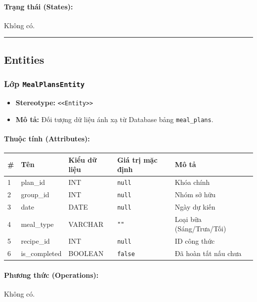 \documentclass[12pt,a4paper]{article}
\begin{document}
\paragraph{Trạng thái (States):}
Không có.

\vskip 0.5cm
\noindent\rule{\textwidth}{0.5pt}
\vskip 0.5cm

\subsection{Entities}


\subsubsection{Lớp \texttt{MealPlansEntity}}

\begin{itemize}[leftmargin=*]
    \item \textbf{Stereotype:} \texttt{\textless{}\textless{}Entity\textgreater{}\textgreater{}}
    \item \textbf{Mô tả:} Đối tượng dữ liệu ánh xạ từ Database bảng \texttt{meal\_plans}.
\end{itemize}

\paragraph{Thuộc tính (Attributes):}
\begin{longtable}{|p{0.6cm}|p{3.5cm}|p{2.4cm}|p{1.8cm}|p{5.1cm}|}
\hline
\textbf{\#} & \textbf{Tên} & \textbf{Kiểu dữ liệu} & \textbf{Giá trị mặc định} & \textbf{Mô tả} \\ \hline
\endhead
1 & plan\_id & INT & \texttt{null} & Khóa chính \\ \hline
2 & group\_id & INT & \texttt{null} & Nhóm sở hữu \\ \hline
3 & date & DATE & \texttt{null} & Ngày dự kiến \\ \hline
4 & meal\_type & VARCHAR & \texttt{""} & Loại bữa (Sáng/Trưa/Tối) \\ \hline
5 & recipe\_id & INT & \texttt{null} & ID công thức \\ \hline
6 & is\_completed & BOOLEAN & \texttt{false} & Đã hoàn tất nấu chưa \\ \hline
\end{longtable}

\paragraph{Phương thức (Operations):}
Không có.
\end{document}
